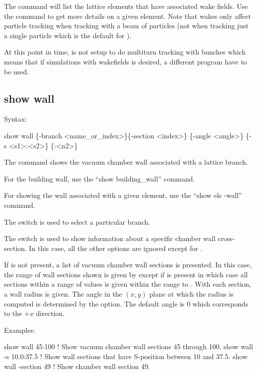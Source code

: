 {{{{{{{{{The  command will list the lattice elements that have associated wake
fields.  Use the  command to get more details on a given element. Note that
wakes only affect particle tracking when tracking with a beam of particles (not when
tracking just a single particle which is the default for \tao). 

At this point in time, \tao is not setup to do multiturn tracking with bunches which means
that if simulations with wakefields is desired, a different program have to be used.


\subsection{show wall}
\label{s:show.wall}

Syntax:
\begin{example}
  show wall \{-branch <name_or_index>\}\{-section <index>\} \{-angle <angle>\}
  \{-s <s1>:<s2>\} \{<n1>:<n2>\}
\end{example}

The  command shows the vacuum chamber wall associated with a lattice branch.

For the building wall, use the ``show building_wall'' command.

For showing the wall associated with a given element, use the ``show ele -wall'' command.

The  switch is used to select a particular branch.

The  switch is used to show information about a specific chamber wall
cross-section. In this case, all the other options are ignored except for .

If  is not present, a list of vacuum chamber wall sections is presented. In
this case, the range of wall sections shown is given by  except if 
is present in which case all sections within a range of  values is given within the
range  to . With each section, a wall radius is given. The angle in the
$(x,y)$ plane at which the radius is computed is determined by the  option. The
default angle is 0 which corresponds to the $+x$ direction.

Examples:
\begin{example}
  show wall 45:100       ! Show vacuum chamber wall sections 45 through 100.
  show wall -s 10.0:37.5 ! Show wall sections that have S-position between 10 and 37.5.
  show wall -section 49  ! Show chamber wall section 49.
\end{example}

}}}}}}}}}
